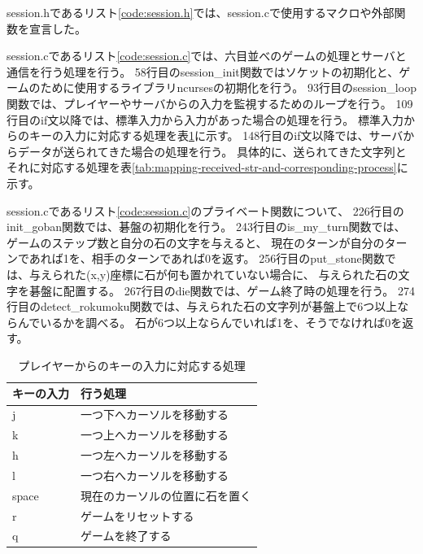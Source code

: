 \documentclass[a4j, titlepage, 10pt]{jsarticle}
\begin{document}
session.hであるリスト\ref{code:session.h}では、session.cで使用するマクロや外部関数を宣言した。

\lstset{ numbers = left }


session.cであるリスト\ref{code:session.c}では、六目並べのゲームの処理とサーバと通信を行う処理を行う。
58行目のsession\_init関数ではソケットの初期化と、ゲームのために使用するライブラリncursesの初期化を行う。
93行目のsession\_loop関数では、プレイヤーやサーバからの入力を監視するためのループを行う。
109行目のif文以降では、標準入力から入力があった場合の処理を行う。
標準入力からのキーの入力に対応する処理を表\ref{tab:player-key-mapping}に示す。
148行目のif文以降では、サーバからデータが送られてきた場合の処理を行う。
具体的に、送られてきた文字列とそれに対応する処理を表\ref{tab:mapping-received-str-and-corresponding-process}に示す。

session.cであるリスト\ref{code:session.c}のプライベート関数について、
226行目のinit\_goban関数では、碁盤の初期化を行う。
243行目のis\_my\_turn関数では、ゲームのステップ数と自分の石の文字を与えると、
現在のターンが自分のターンであれば1を、相手のターンであれば0を返す。
256行目のput\_stone関数では、与えられた(x,y)座標に石が何も置かれていない場合に、
与えられた石の文字を碁盤に配置する。
267行目のdie関数では、ゲーム終了時の処理を行う。
274行目のdetect\_rokumoku関数では、与えられた石の文字列が碁盤上で6つ以上ならんでいるかを調べる。
石が6つ以上ならんでいれば1を、そうでなければ0を返す。

\lstset{ numbers = left }


\begin{table}[H]
  \centering
  \caption{プレイヤーからのキーの入力に対応する処理}
  \label{tab:player-key-mapping}
  \begin{tabular}{ll} \toprule
    キーの入力 & 行う処理 \\
    \midrule
    j & 一つ下へカーソルを移動する \\
    k & 一つ上へカーソルを移動する \\
    h & 一つ左へカーソルを移動する \\
    l & 一つ右へカーソルを移動する \\
    space & 現在のカーソルの位置に石を置く \\
    r & ゲームをリセットする \\
    q & ゲームを終了する \\
    \bottomrule
  \end{tabular}
\end{table}
\end{document}
